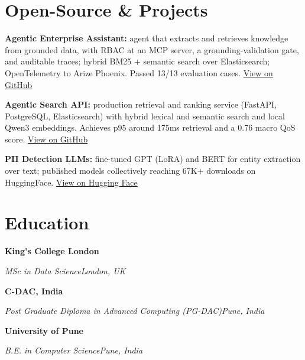\documentclass[10pt,a4paper]{article}
\newcommand{\entry}[4]{%
  {\color{company}\bfseries #1}\hfill {\color{muted}#2}\par
  \vspace{1pt}
  {\itshape #3}\hfill {\color{muted}\itshape #4}\par
  \vspace{3pt}%
}
\begin{document}
\section{Open-Source \& Projects}
\begin{tight}
  \item \textbf{Agentic Enterprise Assistant:} agent that extracts and retrieves knowledge from grounded data, with RBAC at an MCP server, a grounding-validation gate, and auditable traces; hybrid BM25 + semantic search over Elasticsearch; OpenTelemetry to Arize Phoenix. Passed 13/13 evaluation cases. \href{https://github.com/abhijeetscode/Agentic-Enterprise-Assistant}{View on GitHub}
  \item \textbf{Agentic Search API:} production retrieval and ranking service (FastAPI, PostgreSQL, Elasticsearch) with hybrid lexical and semantic search and local Qwen3 embeddings. Achieves p95 around 175ms retrieval and a 0.76 macro QoS score. \href{https://github.com/abhijeetscode/search-agent}{View on GitHub}
  \item \textbf{PII Detection LLMs:} fine-tuned GPT (LoRA) and BERT for entity extraction over text; published models collectively reaching 67K+ downloads on HuggingFace. \href{https://huggingface.co/ab-ai/pii_model}{View on Hugging Face}
\end{tight}

\section{Education}
\entry{King's College London}{}{MSc in Data Science}{London, UK}
\vspace{-3pt}
\entry{C-DAC, India}{}{Post Graduate Diploma in Advanced Computing (PG-DAC)}{Pune, India}
\vspace{-3pt}
\entry{University of Pune}{}{B.E. in Computer Science}{Pune, India}
\end{document}
